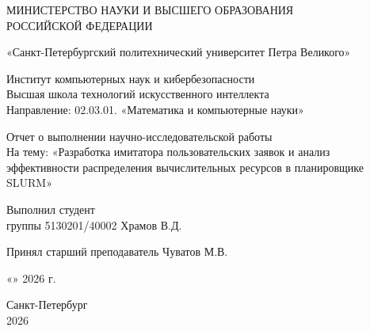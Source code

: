 \begin{titlepage}
    \thispagestyle{empty}
    \begin{center}
        {\large МИНИСТЕРСТВО НАУКИ И ВЫСШЕГО ОБРАЗОВАНИЯ \\
            РОССИЙСКОЙ ФЕДЕРАЦИИ}

        { «Санкт-Петербургский политехнический университет Петра Великого» }

        { Институт компьютерных наук и кибербезопасности \\
            Высшая школа технологий искусственного интеллекта \\
            Направление: 02.03.01. «Математика и компьютерные науки» \\ }

        \vspace{3cm}
        { \large Отчет о выполнении научно-исследовательской работы \\
            На тему: «Разработка имитатора пользовательских заявок и анализ эффективности распределения вычислительных ресурсов в планировщике SLURM»}
    \end{center}

    \vspace{3cm}
    \begin{center}
        \noindent
        \begin{minipage}[t]{\textwidth}
            \raggedright Выполнил студент  \\ группы 5130201/40002 \hfill
            \underline{\hspace{3cm}} Храмов В.Д.
        \end{minipage}

        \vspace{1cm}

        \noindent
        \begin{minipage}[t]{\textwidth}
            \raggedright Принял старший преподаватель \hfill
            \underline{\hspace{3cm}} Чуватов М.В.
        \end{minipage}
    \end{center}

    \vspace{1cm}
    \begin{flushright}
        \large
        «\underline{\hspace{1cm}}» \underline{\hspace{3cm}} 2026 г.
    \end{flushright}

    \vfill
    \begin{center}
        Санкт-Петербург \\
        2026
    \end{center}
\end{titlepage}

\setcounter{page}{2}